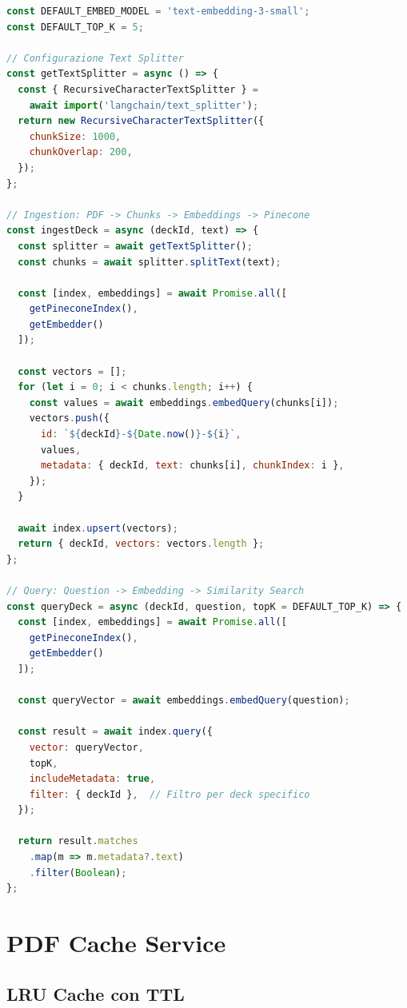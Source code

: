 \documentclass[11pt,a4paper]{article}
\begin{document}
\begin{lstlisting}[language=JavaScript, caption={Vector Store Service}]
const DEFAULT_EMBED_MODEL = 'text-embedding-3-small';
const DEFAULT_TOP_K = 5;

// Configurazione Text Splitter
const getTextSplitter = async () => {
  const { RecursiveCharacterTextSplitter } = 
    await import('langchain/text_splitter');
  return new RecursiveCharacterTextSplitter({
    chunkSize: 1000,
    chunkOverlap: 200,
  });
};

// Ingestion: PDF -> Chunks -> Embeddings -> Pinecone
const ingestDeck = async (deckId, text) => {
  const splitter = await getTextSplitter();
  const chunks = await splitter.splitText(text);
  
  const [index, embeddings] = await Promise.all([
    getPineconeIndex(), 
    getEmbedder()
  ]);

  const vectors = [];
  for (let i = 0; i < chunks.length; i++) {
    const values = await embeddings.embedQuery(chunks[i]);
    vectors.push({
      id: `${deckId}-${Date.now()}-${i}`,
      values,
      metadata: { deckId, text: chunks[i], chunkIndex: i },
    });
  }

  await index.upsert(vectors);
  return { deckId, vectors: vectors.length };
};

// Query: Question -> Embedding -> Similarity Search
const queryDeck = async (deckId, question, topK = DEFAULT_TOP_K) => {
  const [index, embeddings] = await Promise.all([
    getPineconeIndex(), 
    getEmbedder()
  ]);
  
  const queryVector = await embeddings.embedQuery(question);
  
  const result = await index.query({
    vector: queryVector,
    topK,
    includeMetadata: true,
    filter: { deckId },  // Filtro per deck specifico
  });

  return result.matches
    .map(m => m.metadata?.text)
    .filter(Boolean);
};
\end{lstlisting}

\section{PDF Cache Service}

\subsection{LRU Cache con TTL}
\end{document}
